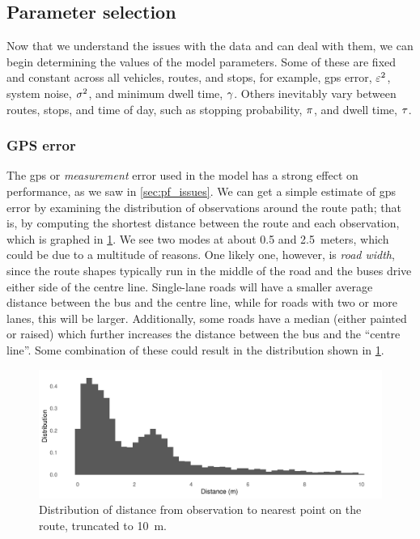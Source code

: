 \subsection{Parameter selection}
\label{sec:pf_params}

Now that we understand the issues with the data and can deal with them, we can begin determining the values of the model parameters. Some of these are fixed and constant across all vehicles, routes, and stops, for example, \gls{gps} error, $\varepsilon^2$, system noise, $\sigma^2$, and minimum dwell time, $\gamma$. Others inevitably vary between routes, stops, and time of day, such as stopping probability, $\pi$, and dwell time, $\tau$.


\subsubsection{GPS error}
\label{sec:pf_params_gps}

The \gls{gps} or \emph{measurement} error used in the model has a strong effect on performance, as we saw in \cref{sec:pf_issues}. We can get a simple estimate of \gls{gps} error by examining the distribution of observations around the route path; that is, by computing the shortest distance between the route and each observation, which is graphed in \cref{fig:pf_param_gps}. We see two modes at about 0.5 and 2.5~meters, which could be due to a multitude of reasons. One likely one, however, is \emph{road width}, since the route shapes typically run in the middle of the road and the buses drive either side of the centre line. Single-lane roads will have a smaller average distance between the bus and the centre line, while for roads with two or more lanes, this will be larger. Additionally, some roads have a median (either painted or raised) which further increases the distance between the bus and the ``centre line''. Some combination of these could result in the distribution shown in \cref{fig:pf_param_gps}.



\begin{knitrout}\small
{}\color{fgcolor}\begin{figure}
\includegraphics[width=\maxwidth]{figure/pf_param_gps-1} \caption[Distribution of distance from observation to nearest point on the route, truncated to 10~m]{Distribution of distance from observation to nearest point on the route, truncated to 10~m.}\label{fig:pf_param_gps}
\end{figure}


\end{knitrout}

